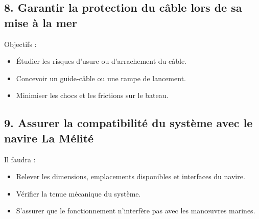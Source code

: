 \documentclass[a4paper,11pt]{article}
\begin{document}
\subsection*{8. Garantir la protection du câble lors de sa mise à la mer}
Objectifs :
\begin{itemize}
  \item Étudier les risques d’usure ou d’arrachement du câble.
  \item Concevoir un guide-câble ou une rampe de lancement.
  \item Minimiser les chocs et les frictions sur le bateau.
\end{itemize}

\subsection*{9. Assurer la compatibilité du système avec le navire La Mélité}
Il faudra :
\begin{itemize}
  \item Relever les dimensions, emplacements disponibles et interfaces du navire.
  \item Vérifier la tenue mécanique du système.
  \item S’assurer que le fonctionnement n’interfère pas avec les manœuvres marines.
\end{itemize}
\end{document}
